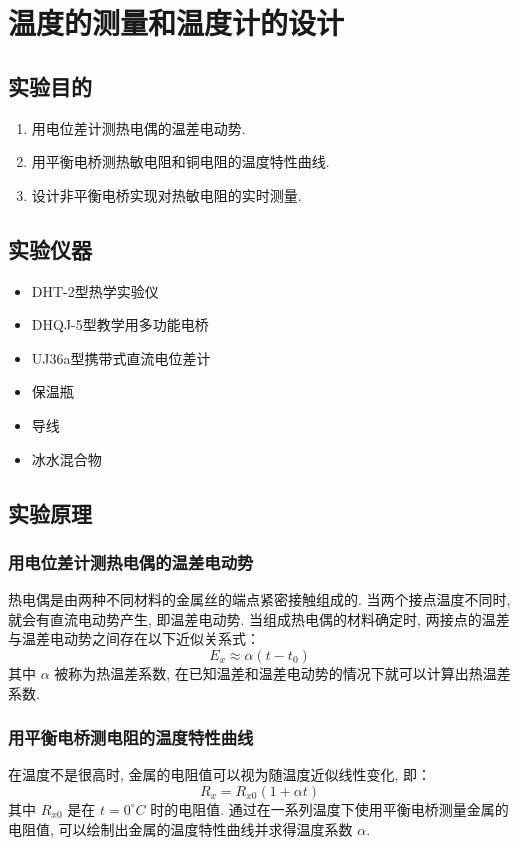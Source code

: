 \documentclass[zihao=5, UTF8]{article}
\theoremstyle{MyLineTheoremStyle} %
\theoremstyle{MyBlockTheoremStyle} %
\theoremstyle{MySubsubsectionStyle} %
\begin{document}
\section{温度的测量和温度计的设计}
\subsection{实验目的}
\begin{enumerate}
    \item 用电位差计测热电偶的温差电动势. 
    \item 用平衡电桥测热敏电阻和铜电阻的温度特性曲线. 
    \item 设计非平衡电桥实现对热敏电阻的实时测量. 
\end{enumerate}

\subsection{实验仪器}
\begin{itemize}
    \item DHT-2型热学实验仪
    \item DHQJ-5型教学用多功能电桥
    \item UJ36a型携带式直流电位差计
    \item 保温瓶
    \item 导线
    \item 冰水混合物
\end{itemize}

\subsection{实验原理}
\subsubsection{用电位差计测热电偶的温差电动势}
热电偶是由两种不同材料的金属丝的端点紧密接触组成的. 当两个接点温度不同时, 就会有直流电动势产生, 即温差电动势. 当组成热电偶的材料确定时, 两接点的温差与温差电动势之间存在以下近似关系式：
\begin{equation}
    E_x \approx \alpha (t - t_0)
\end{equation}
其中 $\alpha$ 被称为热温差系数, 在已知温差和温差电动势的情况下就可以计算出热温差系数. 

\subsubsection{用平衡电桥测电阻的温度特性曲线}
在温度不是很高时, 金属的电阻值可以视为随温度近似线性变化, 即：
\begin{equation}
    R_x = R_{x0} (1 + \alpha t)
\end{equation}
其中 $R_{x0}$ 是在 $t = 0^\circ C$ 时的电阻值. 通过在一系列温度下使用平衡电桥测量金属的电阻值, 可以绘制出金属的温度特性曲线并求得温度系数 $\alpha$. 
\end{document}
